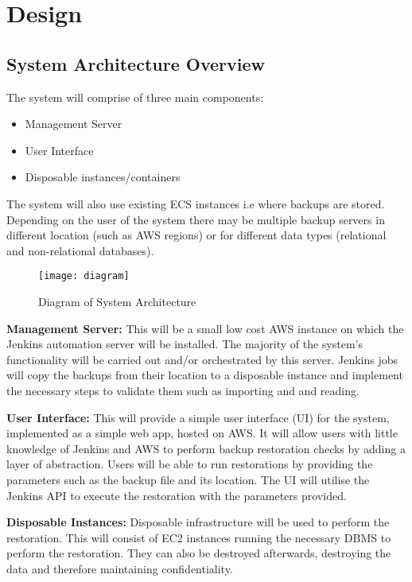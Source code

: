 
\section{Design}
	\subsection{System Architecture Overview}
		The system will comprise of three main components:
		\begin{itemize}
			\item Management Server
			\item User Interface
			\item Disposable instances/containers
		\end{itemize}
		The system will also use existing ECS instances i.e  where backups are stored. Depending on the user of the system there may be multiple backup servers in different location (such as AWS regions) or for different data types (relational and non-relational databases).
		
		\begin{figure}[H]
			\setlength{\belowcaptionskip}{15pt plus 3pt minus 2pt}
			\caption{Diagram of System Architecture}
			\centering
			\texttt{[image: diagram]}
			\label{fig:diagram}
		\end{figure}
		
		\noindent \textbf{Management Server:} This will be a small low cost AWS instance on which the Jenkins automation server will be installed. The majority of the system's functionality will be carried out and/or orchestrated by this server. Jenkins jobs will copy the backups from their location to a disposable instance and implement the necessary steps to validate them such as importing and and reading.
		
		\noindent \textbf{User Interface:} This will provide a simple user interface (UI) for the system, implemented as a simple web app, hosted on AWS. It will allow users with little knowledge of Jenkins and AWS to perform backup restoration checks by adding a layer of abstraction. Users will be able to run restorations by providing the parameters such as the backup file and its location. The UI will utilise the Jenkins API to execute the restoration with the parameters provided.
		
		\noindent\textbf{Disposable Instances:} Disposable infrastructure will be used to perform the restoration. This will consist of EC2 instances running the necessary DBMS to perform the restoration. They can also be destroyed afterwards, destroying the data and therefore maintaining confidentiality.

